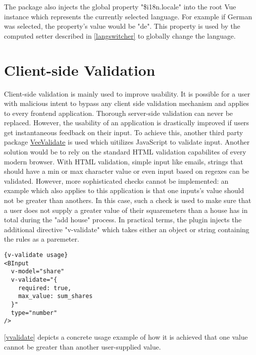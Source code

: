 The package also injects the global property "\$i18n.locale" into the root Vue instance which represents the currently selected language. For example if German was selected, the property's value would be "de". This property is used by the computed setter described in \autoref{langswitcher} to globally change the language.

\section{Client-side Validation}
Client-side validation is mainly used to improve usability. It is possible for a user with malicious intent to bypass any client side validation mechanism and applies to every frontend application. Thorough server-side validation can never be replaced. However, the usability of an application is drastically improved if users get instantaneous feedback on their input. To achieve this, another third party package \href{https://baianat.github.io/vee-validate/}{VeeValidate} is used which uitilizes JavaScript to validate input. Another solution would be to rely on the standard HTML validation capabilites of every modern browser. With HTML validation, simple input like emails, strings that should have a min or max character value or even input based on regexes can be validated. However, more sophisticated checks cannot be implemented: an example which also applies to this application is that one inputs's value should not be greater than anothers. In this case, such a check is used to make sure that a user does not supply a greater value of their squaremeters than a house has in total during the "add house" process. In practical terms, the plugin injects the additional directive "v-validate" which takes either an object or string containing the rules as a paremeter. \newline


\begin{lstlisting}[caption=v-validate usage, captionpos=b, style=htmlcssjs, label=vvalidate]{v-validate usage}
<BInput
  v-model="share"
  v-validate="{
    required: true,
    max_value: sum_shares
  }"
  type="number"
/>
\end{lstlisting}


\autoref{vvalidate} depicts a concrete usage example of how it is achieved that one value cannot be greater than another user-supplied value. 

